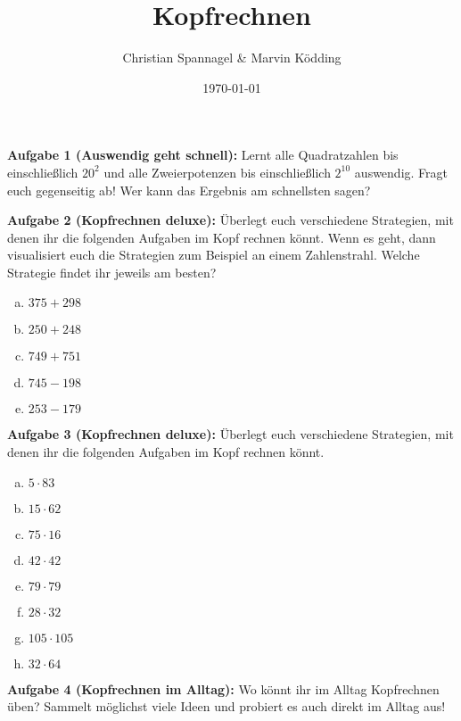 \documentclass{../cssheet}
\title{Kopfrechnen}
\author{Christian Spannagel \& Marvin Ködding}
\date{\today}
\begin{document}
\printtitle

\textbf{Aufgabe 1 (Auswendig geht schnell):} Lernt alle Quadratzahlen bis einschließlich $20^2$ und alle Zweierpotenzen bis einschließlich $2^10$ auswendig. Fragt euch gegenseitig ab! Wer kann das Ergebnis am schnellsten sagen?


\textbf{Aufgabe 2 (Kopfrechnen deluxe):} 
Überlegt euch verschiedene Strategien, mit denen ihr die folgenden Aufgaben im Kopf rechnen könnt. Wenn es geht, dann visualisiert euch die Strategien zum Beispiel an einem Zahlenstrahl. Welche Strategie findet ihr jeweils am besten?
\begin{enumerate}[a)]
\item $375+298$
\item $250+248$
\item $749+751$
\item $745-198$
\item $253-179$
\end{enumerate}

\textbf{Aufgabe 3 (Kopfrechnen deluxe):} 
Überlegt euch verschiedene Strategien, mit denen ihr die folgenden Aufgaben im Kopf rechnen könnt.
\begin{enumerate}[a)]
\item $5\cdot 83$
\item $15\cdot 62$
\item $75\cdot 16$
\item $42\cdot 42$
\item $79\cdot 79$
\item $28\cdot 32$
\item $105\cdot 105$
\item $32\cdot 64$
\end{enumerate}

\textbf{Aufgabe 4 (Kopfrechnen im Alltag):} 
Wo könnt ihr im Alltag Kopfrechnen üben? Sammelt möglichst viele Ideen und probiert es auch direkt im Alltag aus!

\vspace*{10mm}
\printlicense

\printsocials
\end{document}
